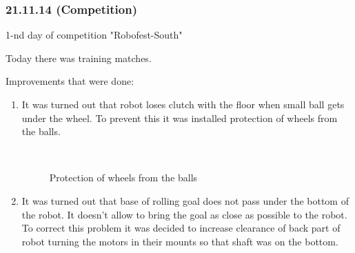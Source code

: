 \subsubsection{21.11.14 (Competition)}

\begin{center}
	1-nd day of competition "Robofest-South"
\end{center}
Today there was training matches.\newline

Improvements that were done:
\begin{enumerate}
	\item It was turned out that robot loses clutch with the floor when small ball gets under the wheel. To prevent this it was installed protection of wheels from the balls.
	
	\begin{figure}[H]
		\begin{minipage}[h]{0.2\linewidth}
			\center  
		\end{minipage}
		\begin{minipage}[h]{0.6\linewidth}
			\caption{Protection of wheels from the balls}
		\end{minipage}
	\end{figure}
	
	\item It was turned out that base of rolling goal does not pass under the bottom of the robot. It doesn't allow to bring the goal as close as possible to the robot. To correct this problem it was decided to increase clearance of back part of robot turning the motors in their mounts so that shaft was on the bottom.
	

\end{enumerate}
